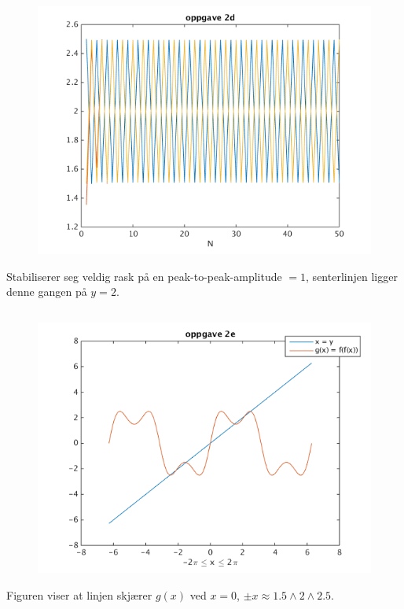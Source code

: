 \documentclass[11pt]{article}
\begin{document}
	\subsection*{}
		\begin{figure}[H]
			\includegraphics[width=13cm]{oppg2d}
		\end{figure}
		\noindent Stabiliserer seg veldig rask på en peak-to-peak-amplitude $ = 1$, senterlinjen ligger denne gangen på $y = 2$.
	\subsection*{}
		\begin{figure}[H]
			\includegraphics[width=13cm]{oppg2e}
		\end{figure}
		\noindent Figuren viser at linjen skjærer $g(x)$ ved $x=0$, $\pm x\approx1.5\wedge2\wedge2.5$.
\end{document}
